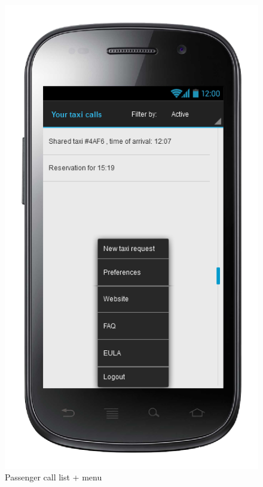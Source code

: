 \begin{center}
\begin{figure} [h]
  	  \includegraphics[scale=0.5]{ui/Passenger call list + menu.png}
\caption{Passenger call list + menu}
    
	\end{figure}
\end{center}

